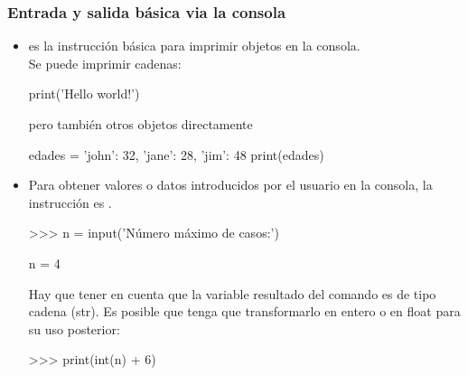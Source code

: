 \documentclass[handout,9pt]{beamer}
\begin{document}
\begin{frame}[fragile]
  \frametitle{Entrada y salida básica via la consola}
  \begin{itemize}
  \item {} es la instrucción básica para imprimir objetos en
    la consola. \\
    Se puede imprimir cadenas:\\
    \begin{pyconsole}
print('Hello world!')
    \end{pyconsole}
    \pause
    pero también otros objetos directamente
    \begin{pyconsole}
edades = {'john': 32,  'jane': 28, 'jim': 48}
print(edades)
    \end{pyconsole}
  \item<3-> Para obtener valores o datos introducidos por el usuario
    en la consola, la instrucción es 
    .
    \begin{pyverbatim}
>>> n = input('Número máximo de casos:')      
\end{pyverbatim}
\begin{pycode}
n = 4
\end{pycode}
\pause
Hay que tener en cuenta que la variable resultado del comando
 es de tipo cadena (str). Es posible que tenga que
transformarlo en entero o en float para su uso posterior:
\begin{pyverbatim}
>>> print(int(n) + 6)
\end{pyverbatim}
  \end{itemize}
\end{frame}
\end{document}

